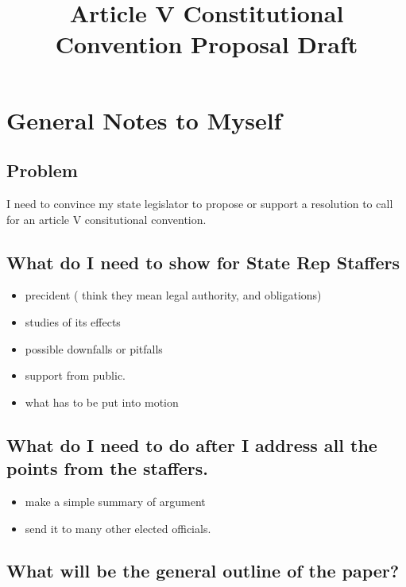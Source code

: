 \documentclass[11pt]{article} %
\title{Article V Constitutional Convention Proposal Draft}
\begin{document}
\section{General Notes to Myself}

\subsection{Problem}
I need to convince my state legislator to propose or support a resolution to call for an article V consitutional convention.

\subsection{What do I need to show for State Rep Staffers}

\begin{itemize}

 \item precident ( think they mean legal authority, and obligations)

\item studies of its effects

\item possible downfalls or pitfalls

\item support from public.

\item what has to be put into motion 

\end{itemize}

\subsection{What do I need to do after I address all the points from the staffers.}

\begin{itemize}

\item make a simple summary of argument

 \item send it to many other elected officials.

\end{itemize}

\subsection{What will be the general outline of the paper?}
\end{document}
